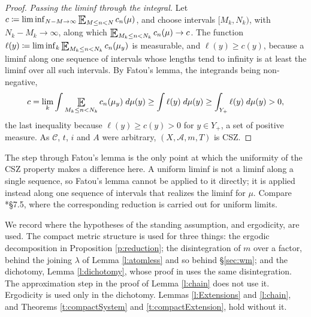 \begin{proof}
\emph{Passing the liminf through the integral.}  Let $c \coloneqq \liminf_{N-M\to\infty} \Expectation_{M\leq n<N} c_n(\mu)$, 
and choose intervals $[M_k,N_k)$, with $N_k - M_k \to \infty$, along which $\Expectation_{M_k\leq n<N_k} c_n(\mu) \to c$.  
The function $\ell(y) \coloneqq \liminf_k \Expectation_{M_k\leq n<N_k} c_n(\mu_y)$ is measurable, and $\ell(y) \geq c(y)$, 
because a liminf along one sequence of intervals whose lengths tend to infinity is at least the liminf over all such intervals.  
By Fatou's lemma, the integrands being non-negative, 
\begin{equation}
c = \lim_k \int \Expectation_{M_k\leq n<N_k} c_n(\mu_y)\;d\mu(y) \geq \int \ell(y)\;d\mu(y) \geq \int_{Y_+} \ell(y)\;d\mu(y) > 0 , 
\end{equation}
the last inequality because $\ell(y) \geq c(y) > 0$ for $y \in Y_+$, a set of positive measure.  As $\mathcal C$, $t$, $i$ and $A$ were arbitrary, $(X,\mathcal A,m,T)$ is CSZ.  
\end{proof}

The step through Fatou's lemma is the only point at which the uniformity of the CSZ property makes a difference here.  
A uniform liminf is not a liminf along a single sequence, so Fatou's lemma cannot be applied to it directly; 
it is applied instead along one sequence of intervals that realizes the liminf for $\mu$.  
Compare \cite{MoreiraNotes}*{\S 7.5}, where the corresponding reduction is carried out for uniform limits.  

We record where the hypotheses of the standing assumption, and ergodicity, are used.  
The compact metric structure is used for three things: the ergodic decomposition in Proposition \ref{p:reduction}; 
the disintegration of $m$ over a factor, behind the joining $\lambda$ of Lemma \ref{l:atomless} and so behind \S\ref{sec:wm}; 
and the dichotomy, Lemma \ref{l:dichotomy}, whose proof in \cite{MoreiraNotes} uses the same disintegration.  
The approximation step in the proof of Lemma \ref{l:chain} does not use it.  
Ergodicity is used only in the dichotomy.  Lemmas \ref{l:Extensions} and \ref{l:chain}, and Theorems \ref{t:compactSystem} and \ref{t:compactExtension}, hold without it.  

